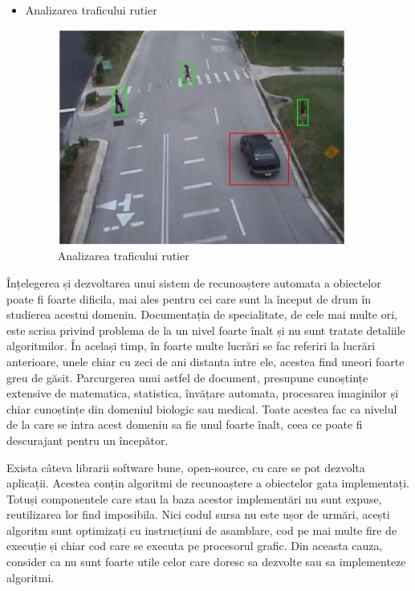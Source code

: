\begin{itemize}
	
	\item Analizarea traficului rutier	
	\begin{figure}[H]
		\centering
			\includegraphics[width=0.9\textwidth]{imagini/traffic_analisys.jpg}
		\caption{Analizarea traficului rutier}
		\label{fig:traffic_analisys}
	\end{figure}
\end{itemize}


Înțelegerea și dezvoltarea unui sistem de recunoaștere automata a obiectelor poate fi foarte dificila, mai ales pentru cei care sunt la început de drum în studierea acestui domeniu. 
Documentația de specialitate, de cele mai multe ori, este scrisa privind problema de la un nivel foarte înalt și nu sunt tratate detaliile algoritmilor. 
În același timp, în foarte multe lucrări se fac referiri la lucrări anterioare, unele chiar cu zeci de ani distanta intre ele, acestea find uneori foarte greu de găsit.
Parcurgerea unui astfel de document, presupune cunoștințe extensive de matematica, statistica, învățare automata, procesarea imaginilor și chiar cunoștințe din domeniul biologic sau medical. 
Toate acestea fac ca nivelul de la care se intra acest domeniu sa fie unul foarte înalt, ceea ce poate fi descurajant pentru un începător.

Exista câteva librarii software bune, open-source, cu care se pot dezvolta aplicații. 
Acestea conțin algoritmi de recunoaștere a obiectelor gata implementați. 
Totuși componentele care stau la baza acestor implementări nu sunt expuse, reutilizarea lor find imposibila.
Nici codul sursa nu este ușor de urmări, acești algoritm sunt optimizați cu instrucțiuni de asamblare, cod pe mai multe fire de execuție și chiar cod care se executa pe procesorul grafic.
Din aceasta cauza, consider ca nu sunt foarte utile celor care doresc sa dezvolte sau sa implementeze algoritmi.

